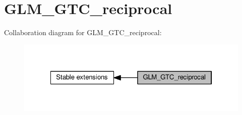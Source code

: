 \hypertarget{group__gtc__reciprocal}{}\section{G\+L\+M\+\_\+\+G\+T\+C\+\_\+reciprocal}
\label{group__gtc__reciprocal}
Collaboration diagram for G\+L\+M\+\_\+\+G\+T\+C\+\_\+reciprocal\+:
\nopagebreak
\begin{figure}[H]
\begin{center}
\leavevmode
\includegraphics[width=322pt]{d1/dbf/group__gtc__reciprocal}
\end{center}
\end{figure}
